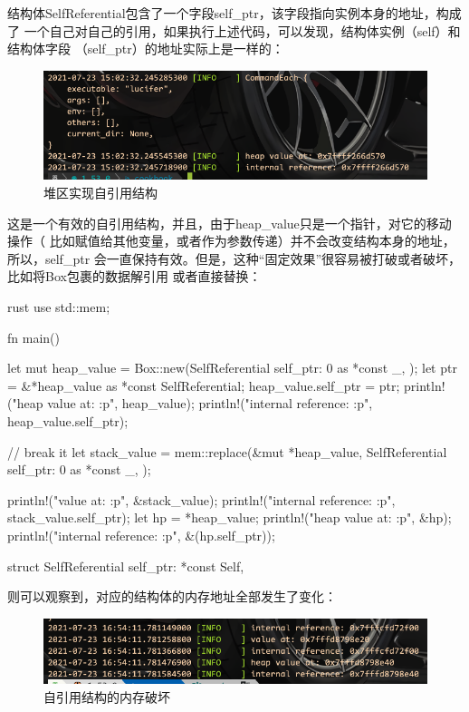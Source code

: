 结构体SelfReferential包含了一个字段self\_ptr，该字段指向实例本身的地址，构成了
一个自己对自己的引用，如果执行上述代码，可以发现，结构体实例（self）和结构体字段
（self\_ptr）的地址实际上是一样的：
\begin{figure}[H]
  \centering
  \includegraphics[width=\linewidth]{self_ref_on_heap.png}
  \caption{堆区实现自引用结构}
  \label{fig:self_ref_on_heap}
\end{figure}

这是一个有效的自引用结构，并且，由于heap\_value只是一个指针，对它的移动操作（
比如赋值给其他变量，或者作为参数传递）并不会改变结构本身的地址，所以，self\_ptr
会一直保持有效。但是，这种“固定效果”很容易被打破或者破坏，比如将Box包裹的数据解引用
或者直接替换：
\begin{code-block}{rust}
use std::mem;

fn main() {
    let mut heap_value = Box::new(SelfReferential {
        self_ptr: 0 as *const _,
    });
    let ptr = &*heap_value as *const SelfReferential;
    heap_value.self_ptr = ptr;
    println!("heap value at: {:p}", heap_value);
    println!("internal reference: {:p}", heap_value.self_ptr);

    // break it
    let stack_value = mem::replace(&mut *heap_value, SelfReferential {
        self_ptr: 0 as *const _,
    });

    println!("value at: {:p}", &stack_value);
    println!("internal reference: {:p}", stack_value.self_ptr);
    let hp = *heap_value;
    println!("heap value at: {:p}", &hp);
    println!("internal reference: {:p}", &(hp.self_ptr));
}
struct SelfReferential { self_ptr: *const Self, }
\end{code-block}
则可以观察到，对应的结构体的内存地址全部发生了变化：
\begin{figure}[H]
  \centering
  \includegraphics[width=\linewidth]{self_ref_on_heap_break.png}
  \caption{自引用结构的内存破坏}
  \label{fig:self_ref_on_heap_break}
\end{figure}

